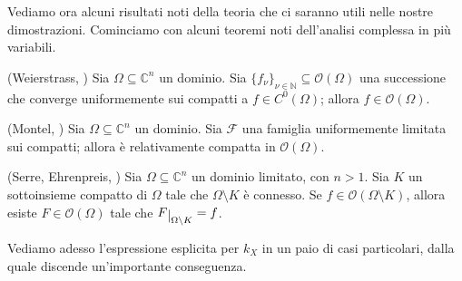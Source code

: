 Vediamo ora alcuni risultati noti della teoria che ci saranno utili nelle nostre dimostrazioni. Cominciamo con alcuni teoremi noti dell'analisi complessa in più variabili.

\begin{thm}
    (Weierstrass, \cite[Chapter 1, Proposition 5]{N}) Sia $\Omega \subseteq \mathbb{C}^n$ un dominio. Sia $\{f_{\nu}\}_{\nu\in\mathbb{N}} \subseteq \mathcal{O}(\Omega)$ una successione che converge uniformemente sui compatti a $f\in C^0(\Omega)$; allora $f\in\mathcal{O}(\Omega)$.
\end{thm}

\begin{thm}
    (Montel, \cite[Chapter 1, Proposition 6]{N}) Sia $\Omega \subseteq \mathbb{C}^n$ un dominio. Sia $\mathcal{F}$ una famiglia uniformemente limitata sui compatti; allora è relativamente compatta in $\mathcal{O}(\Omega)$.
\end{thm}

\begin{thm} \label{hartogs_fen}
    (Serre, Ehrenpreis, \cite[Chapter 1, Paragraph 1.2, Theorem 1.2.6]{Kr}) Sia $\Omega \subseteq \mathbb{C}^n$ un dominio limitato, con $n>1$. Sia $K$ un sottoinsieme compatto di $\Omega$ tale che $\Omega\setminus K$ è connesso. Se $f\in\mathcal{O}(\Omega\setminus K)$, allora esiste $F\in\mathcal{O}(\Omega)$ tale che $F\restrict{\Omega\setminus K}=f$.
\end{thm}

Vediamo adesso l'espressione esplicita per $k_X$ in un paio di casi particolari, dalla quale discende un'importante conseguenza.

